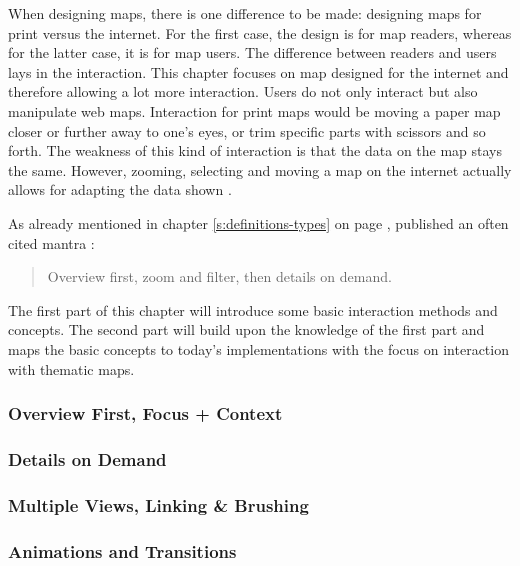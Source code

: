 When designing maps, there is one difference to be made: designing maps for print versus the internet. For the first case, the design is for map readers, whereas for the latter case, it is for map users. The difference between readers and users lays in the interaction. This chapter focuses on map designed for the internet and therefore allowing a lot more interaction. Users do not only interact but also manipulate web maps. Interaction for print maps would be moving a paper map closer or further away to one's eyes, or trim specific parts with scissors and so forth. The weakness of this kind of interaction is that the data on the map stays the same. However, zooming, selecting and moving a map on the internet actually allows for adapting the data shown .

As already mentioned in chapter \ref{s:definitions-types} on page \pageref{s:definitions-types}, \citeauthor{Shneiderman1996} published an often cited mantra :
\begin{quote}
Overview first, zoom and filter, then details on demand.
\end{quote}



The first part of this chapter will introduce some basic interaction methods and concepts. The second part will build upon the knowledge of the first part and maps the basic concepts to today's implementations with the focus on interaction with thematic maps.

\subsubsection{Overview First, Focus + Context}


\subsubsection{Details on Demand}


\subsubsection{Multiple Views, Linking \& Brushing}


\subsubsection{Animations and Transitions}


